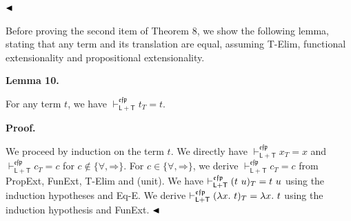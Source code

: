  
  
$\hfill\blacktriangleleft$\par
 
 
 
Before proving the second item of Theorem 8, we show the following lemma, stating that any term and its translation are equal, assuming T-Elim, functional extensionality and propositional extensionality.\par
 
 
 
\par\medskip\noindent\textbf{Lemma 10.}\par
 
 
For any term $t$, we have $\vdash_{\mathsf{L}+\mathsf{T}}^{\mathfrak{e}\mathfrak{f}\mathfrak{p}}t_{T}=t$.\par
 
 
 
 
 
\par\medskip\noindent\textbf{Proof.}\par
 
 
We proceed by induction on the term $t$. We directly have $\vdash_{\mathsf{L}+\mathsf{T}}^{\mathfrak{e}\mathfrak{f}\mathfrak{p}}x_{T}=x$ and $\vdash_{\mathsf{L}+\mathsf{T}}^{\mathfrak{e}\mathfrak{f}\mathfrak{p}}c_{T}=c$ for $c\notin\{{\forall},\mathbin{\Rightarrow}\}$. For $c\in\{{\forall},\mathbin{\Rightarrow}\}$, we derive $\vdash_{\mathsf{L}+\mathsf{T}}^{\mathfrak{e}\mathfrak{f}\mathfrak{p}}c_{T}=c$ from PropExt, FunExt, T-Elim and (unit). We have $\vdash_{\mathsf{L}+\mathsf{T}}^{\mathfrak{e}\mathfrak{f}\mathfrak{p}}(t\leavevmode\nobreak\ u)_{T}=t\leavevmode\nobreak\ u$ using the induction hypotheses and Eq-E. We derive $\vdash_{\mathsf{L}+\mathsf{T}}^{\mathfrak{e}\mathfrak{f}\mathfrak{p}}(\lambda x.\leavevmode\nobreak\ t)_{T}=\lambda x.\leavevmode\nobreak\ t$ using the induction hypothesis and FunExt. $\hfill\blacktriangleleft$\par
 
 
